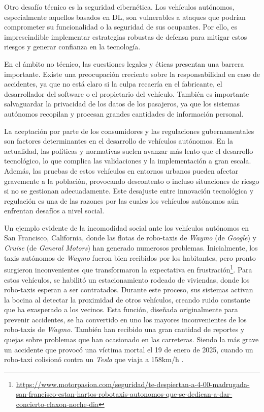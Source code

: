 Otro desafío técnico es la seguridad cibernética. Los vehículos autónomos, especialmente aquellos basados en \ac{DL}, son vulnerables a ataques que podrían comprometer su funcionalidad o la seguridad de sus ocupantes. Por ello, es imprescindible implementar estrategias robustas de defensa para mitigar estos riesgos y generar confianza en la tecnología.

En el ámbito no técnico, las cuestiones legales y éticas presentan una barrera importante. Existe una preocupación creciente sobre la responsabilidad en caso de accidentes, ya que no está claro si la culpa recaería en el fabricante, el desarrollador del software o el propietario del vehículo. También es importante salvaguardar la privacidad de los datos de los pasajeros, ya que los sistemas autónomos recopilan y procesan grandes cantidades de información personal.

La aceptación por parte de los consumidores y las regulaciones gubernamentales son factores determinantes en el desarrollo de vehículos autónomos. En la actualidad, las políticas y normativas suelen avanzar más lento que el desarrollo tecnológico, lo que complica las validaciones y la implementación a gran escala. Además, las pruebas de estos vehículos en entornos urbanos pueden afectar gravemente a la población, provocando descontento o incluso situaciones de riesgo si no se gestionan adecuadamente. Este desajuste entre innovación tecnológica y regulación es una de las razones por las cuales los vehículos autónomos aún enfrentan desafíos a nivel social.

Un ejemplo evidente de la incomodidad social ante los vehículos autónomos en San Francisco, California, donde las flotas de robo-taxis de \textit{Waymo} (de \textit{Google}) y \textit{Cruise} (de \textit{General Motors}) han generado numerosos problemas. Inicialmente, los taxis autónomos de \textit{Waymo} fueron bien recibidos por los habitantes, pero pronto surgieron inconvenientes que transformaron la expectativa en frustración\footnote{\url{https://www.motorpasion.com/seguridad/te-despiertan-a-4-00-madrugada-san-francisco-estan-hartos-robotaxis-autonomos-que-se-dedican-a-dar-concierto-claxon-noche-dia}}. Para estos vehículos, se habilitó un estacionamiento rodeado de viviendas, donde los robo-taxis esperan a ser contratados. Durante este proceso, sus sistemas activan la bocina al detectar la proximidad de otros vehículos, creando ruido constante que ha exasperado a los vecinos. Esta función, diseñada originalmente para prevenir accidentes, se ha convertido en uno los mayores inconvenientes de los robo-taxis de \textit{Waymo}. También han recibido una gran cantidad de reportes y quejas sobre problemas que han ocasionado en las carreteras. Siendo la más grave un accidente que provocó una víctima mortal el 19 de enero de 2025, cuando un robo-taxi colisionó contra un \textit{Tesla} que viaja a 158km/h \cite{waymo-wiki}.

